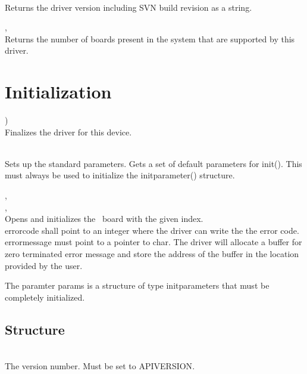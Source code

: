 	\\
	Returns the driver version including SVN build revision as a string. 

	, \\
	\label{countdevices}
	Returns the number of boards present in the system that are supported by this driver.\par


\section {Initialization}

		\device )\\
		Finalizes the driver for this device.

		\\
		Sets up the standard parameters. Gets a set of default parameters for \textsf{\prefix init()}. This must always be used to initialize the \textsf{\prefix init\tu parameter()} structure.\par

		, \\ 
		, \\
		Opens and initializes the \deviceName\ board with the given index. \\
		\textsf{error\tu code} shall point to an integer where the driver can write the the error code. \\
		\textsf{error\tu message} must point to a pointer to char. 
		The driver will allocate a buffer for zero terminated error message and store the address of the buffer in the location provided by the user.\par

		The paramter \textsf{params} is a structure of type \textsf{\prefix init\tu parameters} that must be completely initialized.\par


		\subsection{Structure \initparameters}
			\\
			The version number. Must be set to \textsf{\PREFIX API\tu VERSION}.\par

